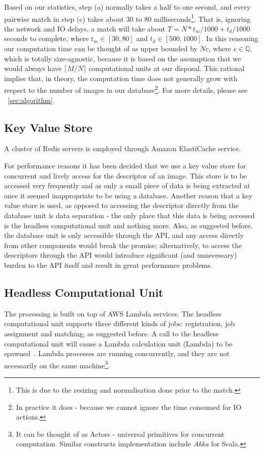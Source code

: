 Based on our statistics, step (a) normally takes a half to one second, and every pairwise match in step (c) takes about 30 to 80 milliseconds\footnote{This is due to the resizing and normalisation done prior to the match.}. That is, ignoring the network and IO delays, a match will take about $T = N * t_m / 1000 + t_d / 1000$ seconds to complete, where $t_m \in [30, 80]$ and $t_d \in [500, 1000]$. In this reasoning our computation time can be thought of as upper bounded by $Nc$, where $c \in \mathbb{Q}$, which is totally size-agnostic, because it is based on the assumption that we would always have $\lceil M / N \rceil$ computational units at our disposal. This rational implies that, in theory, the computation time does not generally grow with respect to the number of images in our database\footnote{In practice it does - because we cannot ignore the time consumed for IO actions.}. For more details, please see ~\ref{sec:algorithm}.

\subsection{Key Value Store}
A cluster of Redis servers is employed through Amazon ElastiCache service. 

For performance reasons it has been decided that we use a key value store for concurrent and lively access for the descriptor of an image. This store is to be accessed very frequently and as only a small piece of data is being extracted at once it seemed inappropriate to be using a database. Another reason that a key value store is used, as opposed to accessing the descriptor directly from the database unit is data separation - the only place that this data is being accessed is the headless computational unit and nothing more. Also, as suggested before, the database unit is only accessible through the API, and any access directly from other components would break the promise; alternatively, to access the descriptors through the API would introduce significant (and unnecessary) burden to the API itself and result in great performance problems.

\subsection{Headless Computational Unit}
\label{sec:lambda}
The processing is built on top of AWS Lambda services. The headless computational unit supports three different kinds of jobs: registration, job assignment and matching, as suggested before. A call to the headless computational unit will cause a Lambda calculation unit (Lambda) to be spawned~\cite{lambda}. Lambda processes are running concurrently, and they are not necessarily on the same machine\footnote{It can be thought of as Actors - universal primitives for concurrent computation. Similar constructs implementation include \textit{Akka} for Scala.}.

